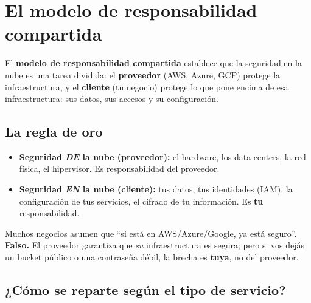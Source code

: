\documentclass[12pt,a4paper]{article}
\begin{document}
\newpage
\section{El modelo de responsabilidad compartida}

\begin{cajaDefinicion}
El \textbf{modelo de responsabilidad compartida} establece que la seguridad en la nube es una tarea dividida: el \textbf{proveedor} (AWS, Azure, GCP) protege la infraestructura, y el \textbf{cliente} (tu negocio) protege lo que pone encima de esa infraestructura: sus datos, sus accesos y su configuraci\'on.
\end{cajaDefinicion}

\subsection{La regla de oro}
\begin{cajaConcepto}[title={``Seguridad DE la nube'' vs ``Seguridad EN la nube''}]
\begin{itemize}[leftmargin=2em]
    \item \textbf{Seguridad \emph{DE} la nube (proveedor):} el hardware, los data centers, la red f\'isica, el hipervisor. Es responsabilidad del proveedor.
    \item \textbf{Seguridad \emph{EN} la nube (cliente):} tus datos, tus identidades (IAM), la configuraci\'on de tus servicios, el cifrado de tu informaci\'on. Es \textbf{tu} responsabilidad.
\end{itemize}
\end{cajaConcepto}

\begin{cajaNota}[title={El error m\'as com\'un}]
Muchos negocios asumen que ``si est\'a en AWS/Azure/Google, ya est\'a seguro''. \textbf{Falso.} El proveedor garantiza que \emph{su} infraestructura es segura; pero si vos dej\'as un bucket p\'ublico o una contrase\~na d\'ebil, la brecha es \textbf{tuya}, no del proveedor.
\end{cajaNota}

\subsection{¿C\'omo se reparte seg\'un el tipo de servicio?}
\end{document}
